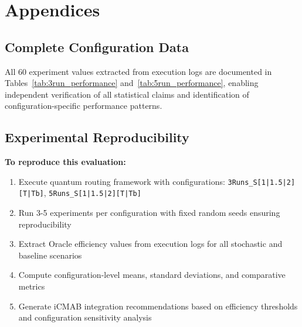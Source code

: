 \documentclass[12pt,a4paper]{article}
\begin{document}
\section{Appendices}

\subsection{Complete Configuration Data}

All 60 experiment values extracted from execution logs are documented in Tables~\ref{tab:3run_performance} and~\ref{tab:5run_performance}, enabling independent verification of all statistical claims and identification of configuration-specific performance patterns.

\subsection{Experimental Reproducibility}

\textbf{To reproduce this evaluation:}
\begin{enumerate}
\item Execute quantum routing framework with configurations: \texttt{3Runs\_S[1|1.5|2][T|Tb]}, \texttt{5Runs\_S[1|1.5|2][T|Tb]}
\item Run 3-5 experiments per configuration with fixed random seeds ensuring reproducibility
\item Extract Oracle efficiency values from execution logs for all stochastic and baseline scenarios
\item Compute configuration-level means, standard deviations, and comparative metrics
\item Generate iCMAB integration recommendations based on efficiency thresholds and configuration sensitivity analysis
\end{enumerate}
\end{document}
